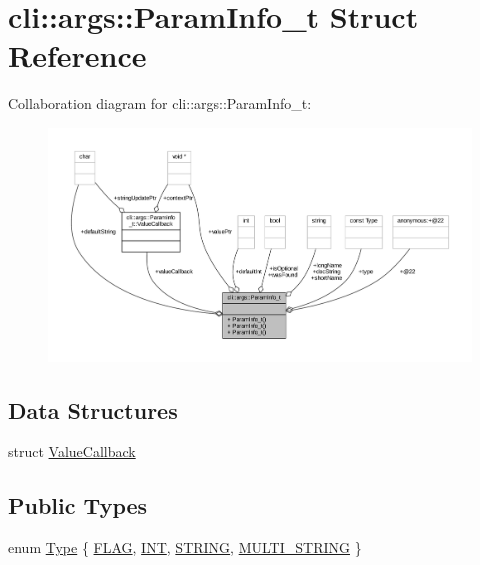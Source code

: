 \hypertarget{structcli_1_1args_1_1_param_info__t}{}\section{cli\+:\+:args\+:\+:Param\+Info\+\_\+t Struct Reference}
\label{structcli_1_1args_1_1_param_info__t}


Collaboration diagram for cli\+:\+:args\+:\+:Param\+Info\+\_\+t\+:
\nopagebreak
\begin{figure}[H]
\begin{center}
\leavevmode
\includegraphics[width=350pt]{structcli_1_1args_1_1_param_info__t__coll__graph}
\end{center}
\end{figure}
\subsection*{Data Structures}
\begin{DoxyCompactItemize}
\item 
struct \hyperlink{structcli_1_1args_1_1_param_info__t_1_1_value_callback}{Value\+Callback}
\end{DoxyCompactItemize}
\subsection*{Public Types}
\begin{DoxyCompactItemize}
\item 
enum \hyperlink{structcli_1_1args_1_1_param_info__t_a7f4d580e3970c35519b05e538cfef71a}{Type} \{ \hyperlink{structcli_1_1args_1_1_param_info__t_a7f4d580e3970c35519b05e538cfef71aaf24378138f9517921bf5a4b46ec3ddc6}{F\+L\+AG}, 
\hyperlink{structcli_1_1args_1_1_param_info__t_a7f4d580e3970c35519b05e538cfef71aa9a156f5b7b067ce9dc1e4105cf8f6127}{I\+NT}, 
\hyperlink{structcli_1_1args_1_1_param_info__t_a7f4d580e3970c35519b05e538cfef71aade81e648e5368dfcab5f211d60a452e2}{S\+T\+R\+I\+NG}, 
\hyperlink{structcli_1_1args_1_1_param_info__t_a7f4d580e3970c35519b05e538cfef71aaf0da783c8acd0b3201a5459d1e99c4cb}{M\+U\+L\+T\+I\+\_\+\+S\+T\+R\+I\+NG}
 \}
\end{DoxyCompactItemize}
